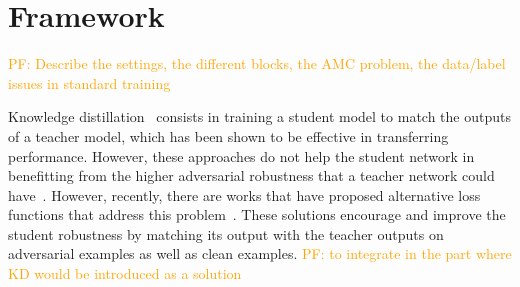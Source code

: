\documentclass[conference]{IEEEtran}
\newcommand{\pf}[1]{{\textcolor{orange}{PF: {#1}}}}
\begin{document}




\section{Framework}

\pf{Describe the settings, the different blocks, the AMC problem, the data/label issues in standard training}


Knowledge distillation~\cite{hinton2015distilling,romero2014fitnets,zagoruyko2016paying,chebotar2016distilling} consists in training a student model to match the outputs of a teacher model, which has been shown to be effective in transferring performance. However, these approaches do not help the student network in benefitting from the higher adversarial robustness that a teacher network could have~\cite{goldblum2020adversarially}. However, recently, there are works that have proposed alternative loss functions that address this problem~\cite{goldblum2020adversarially,zi2021revisiting,zhu2021reliable,shao2021and,maroto2022benefits}. These solutions encourage and improve the student robustness by matching its output with the teacher outputs on adversarial examples as well as clean examples. \pf{to integrate in the part where KD would be introduced as a solution}
\end{document}

